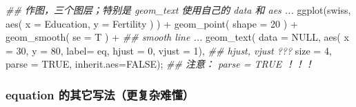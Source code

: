 \documentclass[
]{article}
\newenvironment{Shaded}{}{}
\newcommand{\AttributeTok}[1]{\textcolor[rgb]{0.49,0.56,0.16}{#1}}
\newcommand{\ConstantTok}[1]{\textcolor[rgb]{0.53,0.00,0.00}{#1}}
\newcommand{\DecValTok}[1]{\textcolor[rgb]{0.25,0.63,0.44}{#1}}
\newcommand{\DocumentationTok}[1]{\textcolor[rgb]{0.73,0.13,0.13}{\textit{#1}}}
\newcommand{\FunctionTok}[1]{\textcolor[rgb]{0.02,0.16,0.49}{#1}}
\newcommand{\NormalTok}[1]{#1}
\newcommand{\SpecialCharTok}[1]{\textcolor[rgb]{0.25,0.44,0.63}{#1}}
\begin{document}
\begin{Shaded}
\begin{Highlighting}[]
\DocumentationTok{\#\# 作图，三个图层；特别是 geom\_text 使用自己的 data 和 aes ... }
\FunctionTok{ggplot}\NormalTok{(swiss, }\FunctionTok{aes}\NormalTok{( }\AttributeTok{x =}\NormalTok{ Education,  }\AttributeTok{y =}\NormalTok{ Fertility ) ) }\SpecialCharTok{+}
        \FunctionTok{geom\_point}\NormalTok{( }\AttributeTok{shape =} \DecValTok{20}\NormalTok{ ) }\SpecialCharTok{+}
        \FunctionTok{geom\_smooth}\NormalTok{( }\AttributeTok{se =}\NormalTok{ T ) }\SpecialCharTok{+} \DocumentationTok{\#\# smooth line ... }
        \FunctionTok{geom\_text}\NormalTok{( }\AttributeTok{data =} \ConstantTok{NULL}\NormalTok{,}
                   \FunctionTok{aes}\NormalTok{( }\AttributeTok{x =} \DecValTok{30}\NormalTok{, }\AttributeTok{y =} \DecValTok{80}\NormalTok{, }\AttributeTok{label=}\NormalTok{ eq, }\AttributeTok{hjust =} \DecValTok{0}\NormalTok{, }\AttributeTok{vjust =} \DecValTok{1}\NormalTok{), }\DocumentationTok{\#\# hjust, vjust ???}
                   \AttributeTok{size =} \DecValTok{4}\NormalTok{, }\AttributeTok{parse =} \ConstantTok{TRUE}\NormalTok{, }\AttributeTok{inherit.aes=}\ConstantTok{FALSE}\NormalTok{); }\DocumentationTok{\#\# 注意： parse = TRUE ！！！}
\end{Highlighting}
\end{Shaded}

\hypertarget{equation-ux7684ux5176ux5b83ux5199ux6cd5ux66f4ux590dux6742ux96beux61c2uxff09}{%
\subsubsection{equation
的其它写法（更复杂难懂）}\label{equation-ux7684ux5176ux5b83ux5199ux6cd5ux66f4ux590dux6742ux96beux61c2uxff09}}
\end{document}
